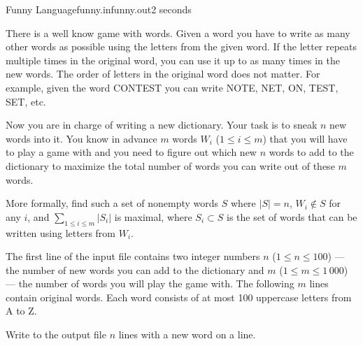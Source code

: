 \begin{problem}{Funny Language}{funny.in}{funny.out}{2 seconds}


There is a well know game with words. Given a word you have to write as many
other words as possible using the letters from the given word. If the letter
repeats multiple times in the original word, you can use it up to as many times
in the new words. The order of letters in the original word does not matter.
For example, given the word CONTEST you can write NOTE, NET, ON, TEST, SET, etc.

Now you are in charge of writing a new dictionary. Your task is to sneak $n$
new words into it. You know in advance $m$ words $W_i$ ($1 \le i \le m$)
that you will have to play a game with and you need to figure out which new $n$ words
to add to the dictionary to maximize the total number of words you can
write out of these $m$ words.

More formally, find such a set of nonempty words $S$ where $|S| = n$,
$W_i \notin S$ for any $i$, and $\sum_{1 \le i \le m} |S_i|$ is maximal, where
$S_i \subset S$ is the set of words that can be written using
letters from $W_i$.

\InputFile

The first line of the input file contains two integer numbers $n$
($1 \le n \le 100$) --- the number of new words you can add to the
dictionary and $m$ ($1 \le m \le 1\,000$) --- the number of words you will
play the game with. The following $m$ lines contain original words.
Each word consists of at most 100 uppercase letters from A to Z.

\OutputFile

Write to the output file $n$ lines with a new word on a line.

\Example

\begin{example}
%
\end{example}

\end{problem}
